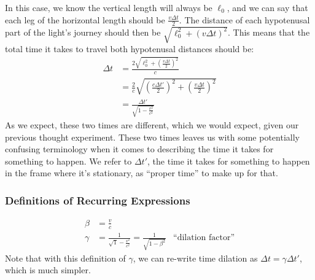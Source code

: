 \documentclass[a4paper]{article}
\begin{document}
In this case, we know the vertical length will always be $\ell_0$, and we can
say that each leg of the horizontal length should be $\frac{v\Delta t}{2}$.
The distance of each hypotenusal part of the light's journey should then be
$\sqrt{\ell_0^2 + (v\Delta t)^2}$. This means that the total time it takes
to travel both hypotenusal distances should be:
\begin{align*}
	\Delta t &=\frac{2\sqrt{\ell_0^2+\left(\frac{v\Delta t}{2}\right)^2}}
		{c}\\
	&= \frac{2}{c}\sqrt{\left(\frac{c\Delta t'}{2}\right)^2+\left(\frac{v
		\Delta t}{2}\right)^2}\\
	&= \frac{\Delta t'}{\sqrt{1 - \frac{v^2}{c^2}}}
\end{align*}
As we expect, these two times are different, which we would expect, given
our previous thought experiment. These two times leaves us with some
potentially confusing terminology when it comes to describing the time it takes
for something to happen. We refer to $\Delta t'$, the time it takes for
something to happen in the frame where it's stationary, as ``proper time'' to
make up for that.

\subsubsection{Definitions of Recurring Expressions}
\begin{align*}
	\beta &= \frac{v}{c}\\
	\gamma&=\frac{1}{\sqrt{1}-\frac{v^2}{c^2}} = \frac{1}{\sqrt{1-\beta^2}}
	&\text{``dilation factor''}
\end{align*}
Note that with this definition of $\gamma$, we can re-write time dilation as
$\Delta t = \gamma \Delta t'$, which is much simpler.
\end{document}
